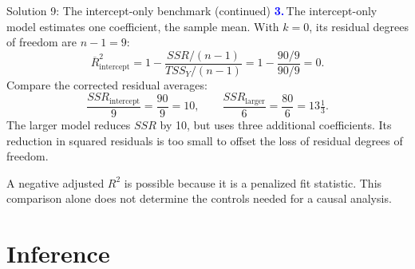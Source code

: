 \documentclass[notes,10pt, aspectratio=169]{beamer}
\newcommand{\answerpart}[1]{\textcolor{blue}{\textbf{#1.}}\,}
\begin{document}
\begin{frame}{Solution 9: The intercept-only benchmark (continued)}
\small
\answerpart{3}The intercept-only model estimates one coefficient, the sample mean. With $k=0$, its residual degrees of freedom are $n-1=9$:
\[
\overline R_{\mathrm{intercept}}^2
=1-\frac{SSR/(n-1)}{TSS_Y/(n-1)}
=1-\frac{90/9}{90/9}=\boxed{0}.
\]
Compare the corrected residual averages:
\[
\frac{SSR_{\mathrm{intercept}}}{9}=\frac{90}{9}=10,
\qquad
\frac{SSR_{\mathrm{larger}}}{6}=\frac{80}{6}=13\tfrac13.
\]
The larger model reduces $SSR$ by 10, but uses three additional coefficients. Its reduction in squared residuals is too small to offset the loss of residual degrees of freedom.

\par\vspace{8pt}
A negative adjusted $R^2$ is possible because it is a penalized fit statistic. This comparison alone does not determine the controls needed for a causal analysis.
\end{frame}
\fi

\section{Inference}
\end{document}
